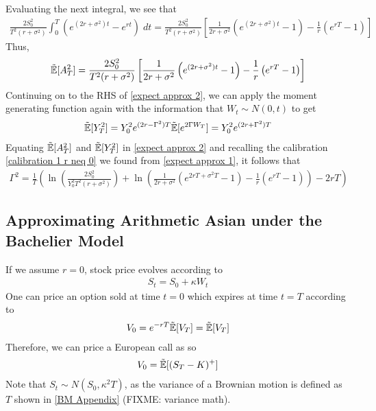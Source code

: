 \documentclass[reqno]{amsart}
\newcommand{\rE}[1]{\tilde{\E}[#1]}
\begin{document}
Evaluating the next integral, we see that
\begin{align}
     \frac{2 S_0^2}{T^2(r + \sigma^2)} \int_0^T  (e^{(2r+\sigma^2)t} - e^{rt}) \; dt = \frac{2 S_0^2}{T^2(r + \sigma^2)} \left[ \frac{1}{2r+\sigma^2} \left( e^{(2r + \sigma^2)t} - 1 \right) - \frac{1}{r} \left( e^{rT} - 1 \right) \right]
\end{align}
Thus,
\begin{align}
     \rE{A_T^2} =  
     \frac{2 S_0^2}{T^2(r + \sigma^2)} \left[ \frac{1}{2r+\sigma^2} \left( e^{(2r + \sigma^2)t} - 1 \right) - \frac{1}{r} \left( e^{rT} - 1 \right) \right]
\end{align}
Continuing on to the RHS of \eqref{expect approx 2}, we can apply the moment generating function again with the information that $W_t \sim N(0, t)$ to get
\begin{align}
     \rE{Y_T^2}
     = Y_0^2 e^{(2r-\Gamma^2)T} \rE{e^{2\Gamma W_T}}
     = Y_0^2 e^{(2r+\Gamma^2)T}
\end{align}
Equating $\rE{A_T^2}$ and $\rE{Y_T^2}$ in \eqref{expect approx 2} and recalling the calibration \eqref{calibration 1 r neq 0} we found from \eqref{expect approx 1}, it follows that
\begin{align}
     \Gamma^2 = \frac{1}{T} \left( \ln{\left( \frac{2S_0^2}{Y_0^2 T^2 (r+\sigma^2)} \right)}+\ln{\left( \frac{1}{2r+\sigma^2} \left( e^{2rT+\sigma^2T} - 1 \right) -\frac{1}{r}(e^{rT}-1) \right)} -2rT \right)
\end{align}

\subsection{Approximating Arithmetic Asian under the Bachelier Model}

If we assume $r=0$, stock price evolves according to 
\begin{align}
     S_t = S_0 + \kappa W_t
\end{align}
One can price an option sold at time $t=0$ which expires at time $t=T$ according to
\begin{align}
     V_0 = e^{-rT} \rE{V_T} = \rE{V_T}
\end{align}
Therefore, we can price a European call as so
\begin{align}
     V_0 = \rE{(S_T-K)^{+}}
\end{align}
Note that $S_t \sim N(S_0,\kappa^2T)$, as the variance of a Brownian motion is defined as $T$ shown in \eqref{BM Appendix} (FIXME: variance math).
\end{document}
